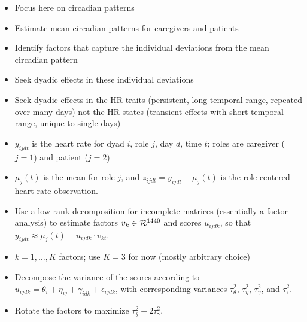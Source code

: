 \documentclass{beamer}
\begin{document}
\begin{frame}

\begin{itemize}

\item Focus here on circadian patterns

\item Estimate mean circadian patterns for caregivers and patients

\item Identify factors that capture the individual deviations from the mean circadian pattern

\item Seek dyadic effects in these individual deviations

\item Seek dyadic effects in the HR traits (persistent, long temporal range, 
repeated over many days) not the
HR states (transient effects with short temporal range, unique to single days)

\end{itemize}

\end{frame}

\begin{frame}

\begin{itemize}

\item $y_{ijdt}$ is the heart rate for dyad $i$, role $j$, day $d$, time $t$; roles are
caregiver ($j=1$) and patient ($j=2$)

\item $\mu_j(t)$ is the mean for role $j$, and $z_{ijdt} = y_{ijdt} - \mu_j(t)$ is the 
role-centered heart rate observation.

\item Use a low-rank decomposition for incomplete matrices (essentially a factor analysis)
to estimate factors $v_k \in {\cal R}^{1440}$ and scores $u_{ijdk}$, so that
$y_{ijdt} \approx \mu_j(t) + u_{ijdk}\cdot v_{kt}$.

\item $k=1, \ldots, K$ factors; use $K=3$ for now (mostly arbitrary choice)

\item Decompose the variance of the scores according to 
$u_{ijdk} = \theta_i + \eta_{ij} + \gamma_{idk} +\epsilon_{ijdk}$, with corresponding
variances $\tau_\theta^2$, $\tau_\eta^2$, $\tau_\gamma^2$, and $\tau_\epsilon^2$.

\item Rotate the factors to maximize $\tau_\theta^2 + 2\tau_\gamma^2$.

\end{itemize}

\end{frame}
\end{document}
